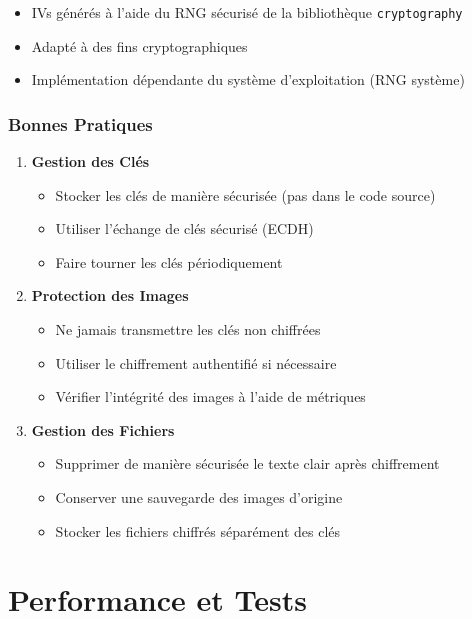 \documentclass[12pt,a4paper]{report}
\begin{document}
\begin{itemize}
    \item IVs générés à l'aide du RNG sécurisé de la bibliothèque \texttt{cryptography}
    \item Adapté à des fins cryptographiques
    \item Implémentation dépendante du système d'exploitation (RNG système)
\end{itemize}

\subsection{Bonnes Pratiques}

\begin{enumerate}
    \item \textbf{Gestion des Clés}
    \begin{itemize}
        \item Stocker les clés de manière sécurisée (pas dans le code source)
        \item Utiliser l'échange de clés sécurisé (ECDH)
        \item Faire tourner les clés périodiquement
    \end{itemize}
    
    \item \textbf{Protection des Images}
    \begin{itemize}
        \item Ne jamais transmettre les clés non chiffrées
        \item Utiliser le chiffrement authentifié si nécessaire
        \item Vérifier l'intégrité des images à l'aide de métriques
    \end{itemize}
    
    \item \textbf{Gestion des Fichiers}
    \begin{itemize}
        \item Supprimer de manière sécurisée le texte clair après chiffrement
        \item Conserver une sauvegarde des images d'origine
        \item Stocker les fichiers chiffrés séparément des clés
    \end{itemize}
\end{enumerate}

\chapter{Performance et Tests}
\end{document}
